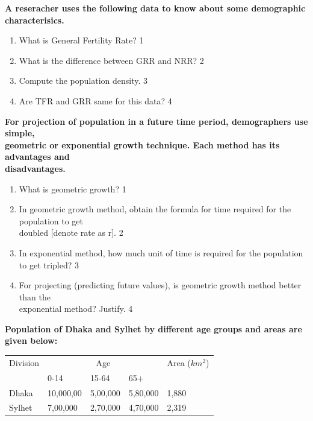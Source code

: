 \documentclass[a4paper,oneside, margin=1.4in]{book}
\begin{document}
   \item
	  \textbf{A reseracher uses the following data to know about some demographic characterisics.} 
  
  \begin{enumerate}
    \item
	What is General Fertility Rate? \hfill 1
    \item
	What is the difference between GRR and NRR? \hfill 2
    \item  
	Compute the population density. \hfill 3
    \item
	Are TFR and GRR same for this data? \hfill 4
  \end{enumerate}
  
 \item
  \textbf{For projection of population in a future time period, demographers use simple, \\ geometric or exponential growth technique. Each method has its advantages and \\ disadvantages.}

  \begin{enumerate}
    \item
	What is geometric growth? \hfill 1
    \item
    	In geometric growth method, obtain the formula for time required for the population to get \\ doubled [denote rate as r]. \hfill 2
    \item
    	In exponential method, how much unit of time is required for the population to get tripled?  \hfill 3
     \item
     	For projecting (predicting future values), is geometric growth method better than the \\ exponential method? Justify.  \hfill 4
  \end{enumerate}
  
     \item
	  \textbf{Population of Dhaka and Sylhet by different age groups and areas are given below:} 
	  
	  \begin{table}[h]
	  \begin{center}
\begin{tabular}{lllll}
Division & \multicolumn{3}{c}{Age}         & Area ($km^2$) \\
         & 0-14      & 15-64    & 65+      &               \\
Dhaka    & 10,000,00 & 5,00,000 & 5,80,000 & 1,880         \\
Sylhet   & 7,00,000  & 2,70,000 & 4,70,000 & 2,319        
\end{tabular}
\end{center}
\end{table}
  
\end{document}

